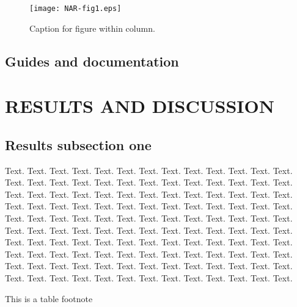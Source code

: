\documentclass[a4,center,fleqn]{NAR}
\begin{document}
\begin{figure}[t]
\begin{center}
\texttt{[image: NAR-fig1.eps]}
\end{center}
\caption{Caption for figure within column.}
\label{NAR-fig1}
\end{figure}

\subsection{Guides and documentation}

\section{RESULTS AND DISCUSSION}

\subsection{Results subsection one}

Text. Text. Text. Text. Text. Text. Text. Text. Text. Text. Text.
Text. Text. Text. Text. Text. Text. Text. Text. Text. Text. Text.
Text. Text. Text. Text. Text. Text. Text. Text. Text. Text. Text.
Text. Text. Text. Text. Text. Text. Text. Text. Text. Text. Text.
Text. Text. Text. Text. Text. Text. Text. Text. Text. Text. Text.
Text. Text. Text. Text. Text. Text. Text. Text. Text. Text. Text.
Text. Text. Text. Text. Text. Text. Text. Text. Text. Text. Text.
Text. Text. Text. Text. Text. Text. Text. Text. Text. Text. Text.
Text. Text. Text. Text. Text. Text. Text. Text. Text. Text. Text.
Text. Text. Text. Text. Text. Text. Text. Text. Text. Text. Text.
Text. Text. Text. Text. Text. Text. Text. Text. Text. Text. Text.
Text. Text. Text. Text. Text. Text. Text. Text. Text.

\begin{table}[b]
{This is a table footnote}
\end{table}
\end{document}
